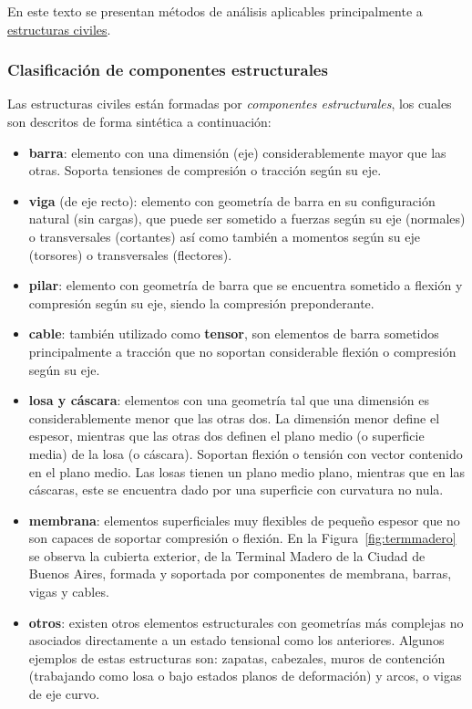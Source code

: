 En este texto se presentan métodos de análisis aplicables principalmente a \underline{estructuras civiles}.









\subsubsection{Clasificación de componentes estructurales}

Las estructuras civiles están formadas por \textit{componentes estructurales}, los cuales son descritos de forma sintética a continuación:
%
\begin{itemize}
	\item \textbf{barra}: elemento con una dimensión (eje) considerablemente mayor que las otras. Soporta tensiones de compresión o tracción según su eje.
	\item \textbf{viga } (de eje recto): elemento con geometría de barra en su configuración natural (sin cargas), que puede ser sometido a fuerzas según su eje (normales) o transversales (cortantes) así como también a momentos según su eje (torsores) o transversales (flectores).
	\item \textbf{pilar}: elemento con geometría de barra que se encuentra sometido a flexión y compresión según su eje, siendo la compresión preponderante.
	\item \textbf{cable}: también utilizado como \textbf{tensor}, son elementos de barra sometidos principalmente a tracción que no soportan considerable flexión o compresión según su eje.
	\item \textbf{losa y cáscara}: elementos con una geometría tal que una dimensión es considerablemente menor que las otras dos. La dimensión menor define el espesor, mientras que las otras dos definen el plano medio (o superficie media) de la losa (o cáscara). %
	Soportan flexión o tensión con vector contenido en el plano medio. %
	Las losas tienen un plano medio plano, mientras que en las cáscaras, este se encuentra dado por una superficie con curvatura no nula.
	\item \textbf{membrana}: elementos superficiales muy flexibles de pequeño espesor que no son capaces de soportar compresión o flexión. %
	En la Figura~\ref{fig:termmadero} se observa la cubierta exterior, de la Terminal Madero de la Ciudad de Buenos Aires, formada y soportada por componentes de membrana, barras, vigas y cables.
	\item \textbf{otros}: existen otros elementos estructurales con geometrías más complejas no asociados directamente a un estado tensional como los anteriores. Algunos ejemplos de estas estructuras son: zapatas, cabezales, muros de contención (trabajando como losa o bajo estados planos de deformación) y arcos, o vigas de eje curvo.
\end{itemize}

